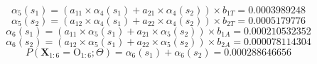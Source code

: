 \documentclass[a4paper,10pt,tikz]{article}
\begin{document}
{\begin{displaymath}
\alpha_5(s_1) = (a_{11}\times \alpha_4(s_1) + a_{21}\times \alpha_4(s_2)) \times b_{1T} = 0.0003989248
\end{displaymath}
\begin{displaymath}
\alpha_5(s_2) = (a_{12}\times \alpha_4(s_1) + a_{22}\times \alpha_4(s_2)) \times b_{2T} = 0.0005179776
\end{displaymath}
\begin{displaymath}
\alpha_6(s_1) = (a_{11}\times \alpha_5(s_1) + a_{21}\times \alpha_5(s_2)) \times b_{1A} = 0.000210532352
\end{displaymath}
\begin{displaymath}
\alpha_6(s_2) = (a_{12}\times \alpha_5(s_1) + a_{22}\times \alpha_5(s_2)) \times b_{2A} = 0.000078114304
\end{displaymath}
\begin{displaymath}
P(\bm{X}_{1:6} = \bm{\mathrm{O}}_{1:6};\bm{\mathrm{\varTheta}}) = \alpha_6(s_1) + \alpha_6(s_2) = 0.000288646656
\end{displaymath}
}
\end{document}
